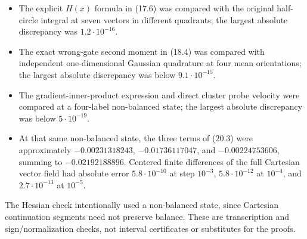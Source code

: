 \documentclass[
  10pt,
]{article}
\providecommand{\tightlist}{%
  \setlength{\itemsep}{0pt}\setlength{\parskip}{0pt}}
\begin{document}
\begin{itemize}
\tightlist
\item
  The explicit \(H(x)\) formula in (17.6) was compared with the original
  half-circle integral at seven vectors in different quadrants; the
  largest absolute discrepancy was \(1.2\cdot10^{-16}\).
\item
  The exact wrong-gate second moment in (18.4) was compared with
  independent one-dimensional Gaussian quadrature at four mean
  orientations; the largest absolute discrepancy was below
  \(9.1\cdot10^{-15}\).
\item
  The gradient-inner-product expression and direct cluster probe
  velocity were compared at a four-label non-balanced state; the largest
  absolute discrepancy was below \(5\cdot10^{-19}\).
\item
  At that same non-balanced state, the three terms of (20.3) were
  approximately \(-0.00231318243\), \(-0.01736117047\), and
  \(-0.00224753606\), summing to \(-0.02192188896\). Centered finite
  differences of the full Cartesian vector field had absolute error
  \(5.8\cdot10^{-10}\) at step \(10^{-3}\), \(5.8\cdot10^{-12}\) at
  \(10^{-4}\), and \(2.7\cdot10^{-13}\) at \(10^{-5}\).
\end{itemize}

The Hessian check intentionally used a non-balanced state, since
Cartesian continuation segments need not preserve balance. These are
transcription and sign/normalization checks, not interval certificates
or substitutes for the proofs.
\end{document}
